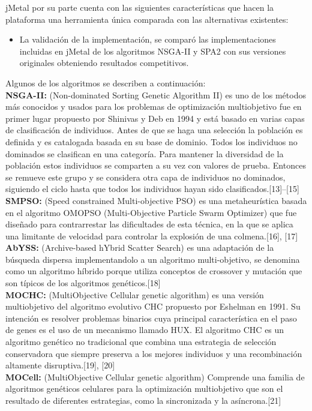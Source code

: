 jMetal por su parte cuenta con las siguientes características que hacen la plataforma una herramienta única comparada con las alternativas existentes:

\begin{itemize}
\item La validación de la implementación, se comparó las implementaciones incluidas en jMetal de los algoritmos NSGA-II y SPA2 con sus versiones originales obteniendo resultados competitivos.\\
\end{itemize}
Algunos de los algoritmos se describen a continuación:\\

\textbf{NSGA-II:} (Non-dominated Sorting Genetic Algorithm II) es uno de los métodos más conocidos y usados para los problemas de optimización multiobjetivo fue en primer lugar propuesto por Shinivas y Deb en 1994 y está basado en varias capas de clasificación de individuos. Antes de que se haga una selección la población es definida y es catalogada basada en su base de dominio. Todos los individuos no dominados se clasifican en una categoría. Para mantener la diversidad de la población estos individuos se comparten a su vez con valores de prueba. Entonces se remueve este grupo y se considera otra capa de individuos no dominados, siguiendo el ciclo hasta que todos los individuos hayan sido clasificados.[13]–[15]\\

\textbf{SMPSO:} (Speed constrained Multi-objective PSO) es una metaheurística basada en el algoritmo OMOPSO (Multi-Objective Particle Swarm Optimizer) que fue diseñado para contrarrestar las dificultades de esta técnica, en la que se aplica una limitante de velocidad para controlar la explosión de una colmena.[16], [17]\\

\textbf{AbYSS:} (Archive-based hYbrid Scatter Search) es una adaptación de la búsqueda dispersa implementandolo a un algoritmo multi-objetivo, se denomina como un algoritmo híbrido porque utiliza conceptos de crossover y mutación que son típicos de los algoritmos genéticos.[18]\\

\textbf{MOCHC:} (MultiObjective Cellular genetic algorithm) es una versión multiobjetivo del algoritmo evolutivo CHC propuesto por Eshelman en 1991. Su intención es resolver problemas binarios cuya principal característica en el paso de genes es el uso de un mecanismo llamado HUX. El algoritmo CHC es un algoritmo genético no tradicional que combina una estrategia de selección conservadora que siempre preserva a los mejores individuos y una recombinación altamente disruptiva.[19], [20]\\

\textbf{MOCell:} (MultiObjective Cellular genetic algorithm) Comprende una familia de algoritmos genéticos celulares para la optimización multiobjetivo que son el resultado de diferentes estrategias, como la sincronizada y la asíncrona.[21]\\



